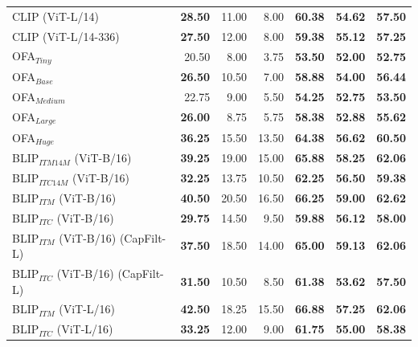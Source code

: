 \begin{table}[ht]
\begin{tabular}{l|rrr|rrr}
 CLIP (ViT-L/14)                     & \textbf{28.50} & 11.00          & 8.00           & \textbf{60.38} & \textbf{54.62} & \textbf{57.50} \\
 CLIP (ViT-L/14-336)                 & \textbf{27.50} & 12.00          & 8.00           & \textbf{59.38} & \textbf{55.12} & \textbf{57.25} \\
 OFA$_{Tiny}$                        & 20.50          & 8.00           & 3.75           & \textbf{53.50} & \textbf{52.00} & \textbf{52.75} \\
 OFA$_{Base}$                        & \textbf{26.50} & 10.50          & 7.00           & \textbf{58.88} & \textbf{54.00} & \textbf{56.44} \\
 OFA$_{Medium}$                      & 22.75          & 9.00           & 5.50           & \textbf{54.25} & \textbf{52.75} & \textbf{53.50} \\
 OFA$_{Large}$                       & \textbf{26.00} & 8.75           & 5.75           & \textbf{58.38} & \textbf{52.88} & \textbf{55.62} \\
 OFA$_{Huge}$                        & \textbf{36.25} & 15.50          & 13.50          & \textbf{64.38} & \textbf{56.62} & \textbf{60.50} \\
 BLIP$_{ITM 14M}$ (ViT-B/16)         & \textbf{39.25} & 19.00          & 15.00          & \textbf{65.88} & \textbf{58.25} & \textbf{62.06} \\
 BLIP$_{ITC 14M}$ (ViT-B/16)         & \textbf{32.25} & 13.75          & 10.50          & \textbf{62.25} & \textbf{56.50} & \textbf{59.38} \\
 BLIP$_{ITM}$ (ViT-B/16)             & \textbf{40.50} & 20.50          & 16.50          & \textbf{66.25} & \textbf{59.00} & \textbf{62.62} \\
 BLIP$_{ITC}$ (ViT-B/16)             & \textbf{29.75} & 14.50          & 9.50           & \textbf{59.88} & \textbf{56.12} & \textbf{58.00} \\
 BLIP$_{ITM}$ (ViT-B/16) (CapFilt-L) & \textbf{37.50} & 18.50          & 14.00          & \textbf{65.00} & \textbf{59.13} & \textbf{62.06} \\
 BLIP$_{ITC}$ (ViT-B/16) (CapFilt-L) & \textbf{31.50} & 10.50          & 8.50           & \textbf{61.38} & \textbf{53.62} & \textbf{57.50} \\
 BLIP$_{ITM}$ (ViT-L/16)             & \textbf{42.50} & 18.25          & 15.50          & \textbf{66.88} & \textbf{57.25} & \textbf{62.06} \\
 BLIP$_{ITC}$ (ViT-L/16)             & \textbf{33.25} & 12.00          & 9.00           & \textbf{61.75} & \textbf{55.00} & \textbf{58.38} \\

\end{tabular}
\end{table}
